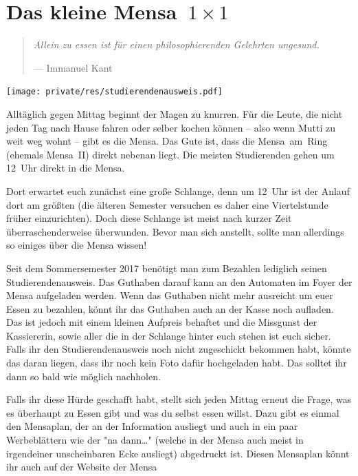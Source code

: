 \section[Das kleine Mensa~1~×~1]{\boldmath Das kleine Mensa~${1 \times 1}$}
\begin{multicols*}{2}
\begin{quote}
	\textit{Allein zu essen ist für einen philosophierenden Gelehrten ungesund.}
	
	\hfill--- Immanuel Kant
\end{quote}

\begin{center}
	\texttt{[image: private/res/studierendenausweis.pdf]}
\end{center}

Alltäglich gegen Mittag beginnt der Magen zu knurren.
Für die Leute, die nicht jeden Tag nach Hause fahren oder selber kochen können -- also wenn Mutti zu weit weg wohnt -- gibt es die Mensa.
Das Gute ist, dass die Mensa~am~Ring (ehemals Mensa~II) direkt nebenan liegt.
Die meisten Studierenden gehen um 12~Uhr direkt in die Mensa.

Dort erwartet euch zunächst eine große Schlange, denn um 12~Uhr ist der Anlauf dort am größten (die älteren Semester versuchen es daher eine Viertelstunde früher einzurichten).
Doch diese Schlange ist meist nach kurzer Zeit überraschenderweise überwunden.
Bevor man sich anstellt, sollte man allerdings so einiges über die Mensa wissen!

Seit dem Sommersemester 2017 benötigt man zum Bezahlen lediglich seinen Studierendenausweis.
Das Guthaben darauf kann an den Automaten im Foyer der Mensa aufgeladen werden.
Wenn das Guthaben nicht mehr ausreicht um euer Essen zu bezahlen, könnt ihr das Guthaben auch an der Kasse noch aufladen. 
Das ist jedoch mit einem kleinen Aufpreis behaftet und die Missgunst der Kassiererin, sowie aller die in der Schlange hinter euch stehen ist euch sicher.
Falls ihr den Studierendenausweis noch nicht zugeschickt bekommen habt, könnte das daran liegen, dass ihr noch kein Foto dafür hochgeladen habt.
Das solltet ihr dann so bald wie möglich nachholen.

Falls ihr diese Hürde geschafft habt, stellt sich jeden Mittag erneut die Frage, was es überhaupt zu Essen gibt und was du selbst essen willst.
Dazu gibt es einmal den Mensaplan, der an der Information ausliegt und auch in ein paar Werbeblättern wie der "na dann\dots" (welche in der Mensa auch meist in irgendeiner unscheinbaren Ecke ausliegt) abgedruckt ist.
Diesen Mensaplan könnt ihr auch auf der Website der Mensa


\end{multicols*}
